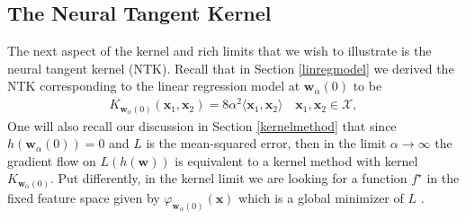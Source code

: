 \documentclass{article}
\begin{document}
\subsection{The Neural Tangent Kernel}\label{visualizeNTK}

The next aspect of the kernel and rich limits that we wish to illustrate is the neural tangent kernel (NTK). Recall that in Section \ref{linregmodel} we derived the NTK corresponding to the linear regression model at $\boldsymbol{w}_{\alpha}(0)$ to be
\begin{align*}
K_{\boldsymbol{w}_{\alpha}(0)}(\boldsymbol{x}_1, \boldsymbol{x}_2) = 8\alpha^2 \langle \boldsymbol{x}_1, \boldsymbol{x}_2 \rangle \quad \boldsymbol{x}_1, \boldsymbol{x}_2 \in \mathcal{X},
\end{align*}
One will also recall our discussion in Section \ref{kernelmethod} that since $h(\boldsymbol{w}_{\alpha}(0)) = 0$ and $L$ is the mean-squared error, then in the limit $\alpha \rightarrow \infty$ the gradient flow on $L(h(\boldsymbol{w}))$ is equivalent to a kernel method with kernel $K_{\boldsymbol{w}_{\alpha}(0)}$. Put differently, in the kernel limit we are looking for a function $f^{\star}$ in the fixed feature space given by $\varphi_{\boldsymbol{w}_{\alpha}(0)}(\boldsymbol{x})$ which is a global minimizer of $L$ \cite{wei2019regularization}.
\end{document}
